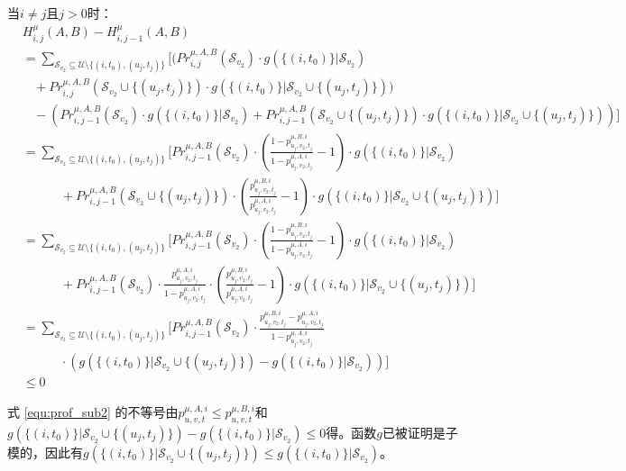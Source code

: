 当$i \ne j$且$j>0$时：
\begin{align}
    &H_{i,j}^{\mu}(A,B)-H_{i,j-1}^{\mu}(A,B) \nonumber \\
    &=\sum_{\mathcal{S}_{v_2}\subseteq \mathcal{U} \setminus \{(i,t_0),(u_j,t_j)\}}[(Pr_{i,j}^{\mu,A,B}(\mathcal{S}_{v_2}) \cdot g(\{(i,t_0)\} |\mathcal{S}_{v_2})\nonumber \\
    &\ \ \ \ + Pr_{i,j}^{\mu,A,B}(\mathcal{S}_{v_2}\cup\{(u_j,t_j)\}) \cdot g(\{(i,t_0)\} |\mathcal{S}_{v_2}\cup \{(u_j,t_j)\})) \nonumber \\ 
    &\ \ \ \ -\left(Pr_{i,j-1}^{\mu,A,B}(\mathcal{S}_{v_2}) \cdot g(\{(i,t_0)\} |\mathcal{S}_{v_2})+Pr_{i,j-1}^{\mu,A,B}(\mathcal{S}_{v_2}\cup\{(u_j,t_j)\}) \cdot g(\{(i,t_0)\} |\mathcal{S}_{v_2} \cup \{(u_j,t_j)\})\right)] \\ 
    &=\sum_{\mathcal{S}_{v_2}\subseteq \mathcal{U} \setminus \{(i,t_0),(u_j,t_j)\}}[Pr_{i,j-1}^{\mu,A,B}(\mathcal{S}_{v_2})\cdot \left(\frac{1-p_{u_j,v_2,t_j}^{\mu,B,i}}{1-p_{u_j,v_2,t_j}^{\mu,A,i}} - 1\right) \cdot g(\{(i,t_0)\} |\mathcal{S}_{v_2})\nonumber\\
    &\quad \quad \quad   +Pr_{i,j-1}^{\mu,A,B}(\mathcal{S}_{v_2}\cup\{(u_j,t_j)\})\cdot \left(\frac{p_{u_j,v_2,t_j}^{\mu,B,i}}{p_{u_j,v_2,t_j}^{\mu,A,i}}-1\right) \cdot g(\{(i,t_0)\} |\mathcal{S}_{v_2} \cup \{(u_j,t_j)\})] \\  
    &=\sum_{\mathcal{S}_{v_2}\subseteq \mathcal{U} \setminus \{(i,t_0),(u_j,t_j)\}}[Pr_{i,j-1}^{\mu,A,B}(\mathcal{S}_{v_2})\cdot \left(\frac{1-p_{u_j,v_2,t_j}^{\mu,B,i}}{1-p_{u_j,v_2,t_j}^{\mu,A,i}} - 1\right) \cdot g(\{(i,t_0)\} |\mathcal{S}_{v_2})\nonumber\\
    &\quad \quad \quad +Pr_{i,j-1}^{\mu,A,B}(\mathcal{S}_{v_2})\cdot \frac{p_{u_j,v_2,t_j}^{\mu,A,i}}{1-p_{u_j,v_2,t_j}^{\mu,A,i}} \cdot \left(\frac{p_{u_j,v_2,t_j}^{\mu,B,i}}{p_{u_j,v_2,t_j}^{\mu,A,i}}-1\right) \cdot g(\{(i,t_0)\} |\mathcal{S}_{v_2}\cup \{(u_j,t_j)\})] \\
    &= \sum_{\mathcal{S}_{v_2}\subseteq \mathcal{U} \setminus \{(i,t_0),(u_j,t_j)\}}[Pr_{i,j-1}^{\mu,A,B}(\mathcal{S}_{v_2})\cdot \frac{p_{u_j,v_2,t_j}^{\mu,B,i}-p_{u_j,v_2,t_j}^{\mu,A,i}}{1-p_{u_j,v_2,t_j}^{\mu,A,i}} \nonumber \\ &\quad \quad \quad \cdot (g(\{(i,t_0)\} |\mathcal{S}_{v_2} \cup \{(u_j,t_j)\})-g(\{(i,t_0)\} |\mathcal{S}_{v_2}))] \\
    &\le 0 \label{equ:prof_sub2}
\end{align}

式 \ref{equ:prof_sub2} 的不等号由$p_{u,v,t}^{\mu,A,i} \le p_{u,v,t}^{\mu,B,i}$和$g(\{(i,t_0)\} |\mathcal{S}_{v_2} \cup \{(u_j,t_j)\})-g(\{(i,t_0)\} |\mathcal{S}_{v_2}) \le 0$得。函数$g$已被证明是子模的\cite{mrim}，因此有$g(\{(i,t_0)\} |\mathcal{S}_{v_2} \cup \{(u_j,t_j)\})\le g(\{(i,t_0)\} |\mathcal{S}_{v_2}) $。

